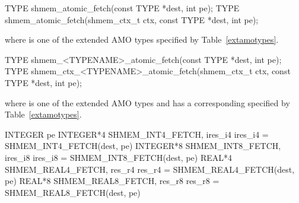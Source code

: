 
\begin{apidefinition}

\begin{C11synopsis}
TYPE shmem_atomic_fetch(const TYPE *dest, int pe);
TYPE shmem_atomic_fetch(shmem_ctx_t ctx, const TYPE *dest, int pe);
\end{C11synopsis}
where \TYPE{} is one of the extended \ac{AMO} types specified by
Table~\ref{extamotypes}.

\begin{Csynopsis}
TYPE shmem_<TYPENAME>_atomic_fetch(const TYPE *dest, int pe);
TYPE shmem_ctx_<TYPENAME>_atomic_fetch(shmem_ctx_t ctx, const TYPE *dest, int pe);
\end{Csynopsis}
where \TYPE{} is one of the extended \ac{AMO} types and has a corresponding
\TYPENAME{} specified by Table~\ref{extamotypes}.

\begin{Fsynopsis}
INTEGER pe
INTEGER*4 SHMEM_INT4_FETCH, ires_i4
ires_i4 = SHMEM_INT4_FETCH(dest, pe)
INTEGER*8 SHMEM_INT8_FETCH, ires_i8
ires_i8 = SHMEM_INT8_FETCH(dest, pe)
REAL*4 SHMEM_REAL4_FETCH, res_r4
res_r4 = SHMEM_REAL4_FETCH(dest, pe)
REAL*8 SHMEM_REAL8_FETCH, res_r8
res_r8 = SHMEM_REAL8_FETCH(dest, pe)
\end{Fsynopsis}

\begin{apiarguments}


\end{apiarguments}




\end{apidefinition}
